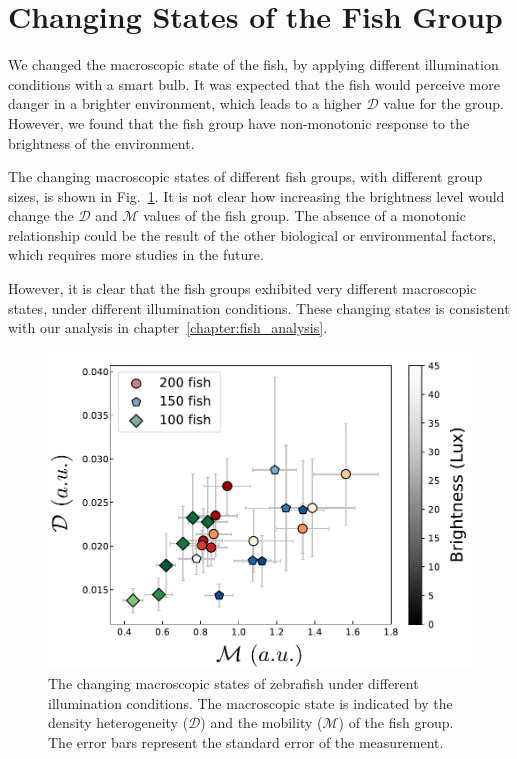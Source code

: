\documentclass[11pt,twoside]{report}
\begin{document}
\section{Changing States of the Fish Group}

We changed the macroscopic state of the fish, by applying different illumination conditions with a smart bulb. It was expected that the fish would perceive more danger in a brighter environment, which leads to a higher $\mathcal{D}$ value for the group. However, we found that the fish group have non-monotonic response to the brightness of the environment.

The changing macroscopic states of different fish groups, with different group sizes, is shown in Fig.~\ref{fig:brightness}. It is not clear how increasing the brightness level would change the $\mathcal{D}$ and $\mathcal{M}$ values of the fish group. The absence of a monotonic relationship could be the result of the other biological or environmental factors, which requires more studies in the future.

However, it is clear that the fish groups exhibited very different macroscopic states, under different illumination conditions. These changing states is consistent with our analysis in chapter~\ref{chapter:fish_analysis}.

\begin{figure}
  \includegraphics[width=\linewidth]{brightness}
  \caption[The changing macroscopic states of zebrafish]{
  The changing macroscopic states of zebrafish under different illumination conditions. The macroscopic state is indicated by the density heterogeneity ($\mathcal{D}$) and the mobility ($\mathcal{M}$) of the fish group. The error bars represent the standard error of the measurement.
  }
  \label{fig:brightness}
\end{figure}
\end{document}
